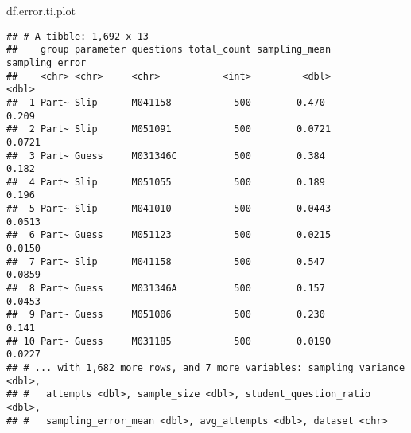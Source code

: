 \documentclass[]{article}
\newenvironment{Shaded}{\begin{snugshade}}{\end{snugshade}}
\newcommand{\CharTok}[1]{\textcolor[rgb]{0.31,0.60,0.02}{#1}}
\newcommand{\DataTypeTok}[1]{\textcolor[rgb]{0.13,0.29,0.53}{#1}}
\newcommand{\KeywordTok}[1]{\textcolor[rgb]{0.13,0.29,0.53}{\textbf{#1}}}
\newcommand{\NormalTok}[1]{#1}
\newcommand{\OperatorTok}[1]{\textcolor[rgb]{0.81,0.36,0.00}{\textbf{#1}}}
\newcommand{\StringTok}[1]{\textcolor[rgb]{0.31,0.60,0.02}{#1}}
\begin{document}
\begin{Shaded}
\begin{Highlighting}[]
\NormalTok{df.error.ti.plot}
\end{Highlighting}
\end{Shaded}

\begin{verbatim}
## # A tibble: 1,692 x 13
##    group parameter questions total_count sampling_mean sampling_error
##    <chr> <chr>     <chr>           <int>         <dbl>          <dbl>
##  1 Part~ Slip      M041158           500        0.470          0.209 
##  2 Part~ Slip      M051091           500        0.0721         0.0721
##  3 Part~ Guess     M031346C          500        0.384          0.182 
##  4 Part~ Slip      M051055           500        0.189          0.196 
##  5 Part~ Slip      M041010           500        0.0443         0.0513
##  6 Part~ Guess     M051123           500        0.0215         0.0150
##  7 Part~ Slip      M041158           500        0.547          0.0859
##  8 Part~ Guess     M031346A          500        0.157          0.0453
##  9 Part~ Guess     M051006           500        0.230          0.141 
## 10 Part~ Guess     M031185           500        0.0190         0.0227
## # ... with 1,682 more rows, and 7 more variables: sampling_variance <dbl>,
## #   attempts <dbl>, sample_size <dbl>, student_question_ratio <dbl>,
## #   sampling_error_mean <dbl>, avg_attempts <dbl>, dataset <chr>
\end{verbatim}

\begin{Shaded}
\end{Shaded}
\end{document}
